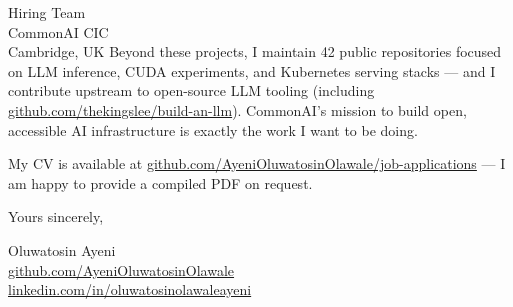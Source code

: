\documentclass[12pt,a4paper]{letter}
\begin{document}
\begin{letter}{Hiring Team \\ CommonAI CIC \\ Cambridge, UK}
Beyond these projects, I maintain 42 public repositories focused on LLM inference, CUDA experiments, and Kubernetes serving stacks — and I contribute upstream to open-source LLM tooling (including \href{https://github.com/thekingslee/build-an-llm}{github.com/thekingslee/build-an-llm}). CommonAI's mission to build open, accessible AI infrastructure is exactly the work I want to be doing.

My CV is available at \href{https://github.com/AyeniOluwatosinOlawale/job-applications/blob/master/cv/main_example.tex}{github.com/AyeniOluwatosinOlawale/job-applications} — I am happy to provide a compiled PDF on request.

\closing{Yours sincerely,}

Oluwatosin Ayeni \\
\href{https://github.com/AyeniOluwatosinOlawale}{github.com/AyeniOluwatosinOlawale} \\
\href{https://www.linkedin.com/in/oluwatosinolawaleayeni/}{linkedin.com/in/oluwatosinolawaleayeni}

\end{letter}
\end{document}
